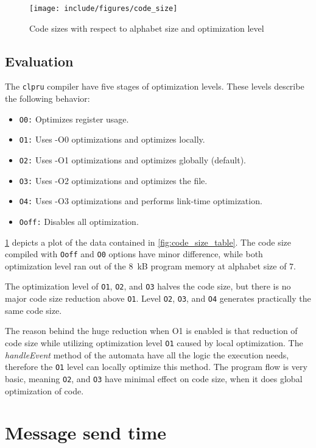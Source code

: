 \begin{figure}
	\centering
	\texttt{[image: include/figures/code\_size]}
	\caption{Code sizes with respect to alphabet size and optimization level}
\label{fig:code_size}
\end{figure}

\subsection{Evaluation}

The \texttt{clpru} compiler have five stages of optimization levels. These levels describe the following behavior:
\begin{itemize}
\item \texttt{O0:} Optimizes register usage.
\item \texttt{O1:} Uses -O0 optimizations and optimizes locally.
\item \texttt{O2:} Uses -O1 optimizations and optimizes globally (default).
\item \texttt{O3:} Uses -O2 optimizations and optimizes the file.
\item \texttt{O4:} Uses -O3 optimizations and performs link-time optimization.
\item \texttt{Ooff:} Disables all optimization.
\end{itemize}

\cref{fig:code_size} depicts a plot of the data contained in \cref{fig:code_size_table}. The code size compiled with \texttt{Ooff} and \texttt{O0} options have minor difference, while both optimization level ran out of the \qty{8}{kB} program memory at alphabet size of $7$.

The optimization level of \texttt{O1}, \texttt{O2}, and \texttt{O3} halves the code size, but there is no major code size reduction above \texttt{O1}. Level \texttt{O2}, \texttt{O3}, and \texttt{O4} generates practically the same code size.

The reason behind the huge reduction when O1 is enabled is that reduction of code size while utilizing optimization level \texttt{O1} caused by local optimization. The \emph{handleEvent} method of the automata have all the logic the execution needs, therefore the \texttt{O1} level can locally optimize this method. The program flow is very basic, meaning \texttt{O2}, and \texttt{O3} have minimal effect on code size, when it does global optimization of code.

\section{Message send time}

